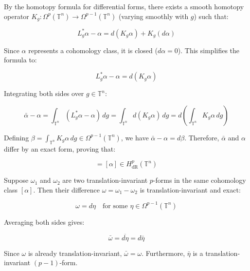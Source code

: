 \documentclass{article}
\begin{document}
	By the homotopy formula for differential forms, there exists a smooth homotopy operator $K_g : \Omega^p(\mathbb{T}^n) \to \Omega^{p-1}(\mathbb{T}^n)$ (varying smoothly with $g$) such that:
	
	\begin{equation*}
		L_g^* \alpha - \alpha = d(K_g \alpha) + K_g(d\alpha)
	\end{equation*}
	
	Since $\alpha$ represents a cohomology class, it is closed ($d\alpha = 0$). This simplifies the formula to:
	
	\begin{equation*}
		L_g^* \alpha - \alpha = d(K_g \alpha)
	\end{equation*}
	
	Integrating both sides over $g \in \mathbb{T}^n$:
	
	\begin{equation*}
		\bar{\alpha} - \alpha = \int_{\mathbb{T}^n} (L_g^* \alpha - \alpha) \, dg = \int_{\mathbb{T}^n} d(K_g \alpha) \, dg = d \left( \int_{\mathbb{T}^n} K_g \alpha \, dg \right)
	\end{equation*}
	
	Defining $\beta = \int_{\mathbb{T}^n} K_g \alpha \, dg \in \Omega^{p-1}(\mathbb{T}^n)$, we have $\bar{\alpha} - \alpha = d\beta$. Therefore, $\bar{\alpha}$ and $\alpha$ differ by an exact form, proving that:
	
	\begin{equation*}
		[\bar{\alpha}] = [\alpha] \in H^p_{\text{dR}}(\mathbb{T}^n)
	\end{equation*}
	
	Suppose $\omega_1$ and $\omega_2$ are two translation-invariant $p$-forms in the same cohomology class $[\alpha]$. Then their difference $\omega = \omega_1 - \omega_2$ is translation-invariant and exact:
	
	\begin{equation*}
		\omega = d\eta \quad \text{for some } \eta \in \Omega^{p-1}(\mathbb{T}^n)
	\end{equation*}
	
	Averaging both sides gives:
	
	\begin{equation*}
		\bar{\omega} = \overline{d\eta} = d\bar{\eta}
	\end{equation*}
	
	Since $\omega$ is already translation-invariant, $\bar{\omega} = \omega$. Furthermore, $\bar{\eta}$ is a translation-invariant $(p-1)$-form.
	
\end{document}
